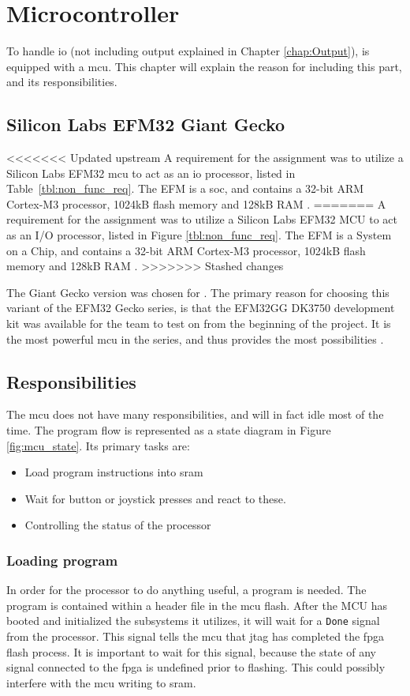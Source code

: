 \chapter{Microcontroller}
\label{ch:mcu}

To handle \gls{io} (not including output explained in Chapter \ref{chap:Output}), \vthreek is equipped with a \gls{mcu}.
This chapter will explain the reason for including this part, and its responsibilities.

\section{Silicon Labs EFM32 Giant Gecko}
<<<<<<< Updated upstream
A requirement for the assignment was to utilize a Silicon Labs EFM32 \gls{mcu} to act as an \gls{io} processor, listed in Table~\ref{tbl:non_func_req}.
The EFM is a \gls{soc}, and contains a 32-bit ARM Cortex-M3 processor, 1024kB flash memory and 128kB RAM \cite{efm32referencemanual}.
=======
A requirement for the assignment was to utilize a Silicon Labs EFM32 MCU to act as an I/O processor, listed in Figure \ref{tbl:non_func_req}.
The EFM is a System on a Chip, and contains a 32-bit ARM Cortex-M3 processor, 1024kB flash memory and 128kB RAM \cite{efm32referencemanual}.
>>>>>>> Stashed changes

The Giant Gecko version was chosen for \vthreek.
The primary reason for choosing this variant of the EFM32 Gecko series, is that the EFM32GG DK3750 development kit was available for the team to test on from the beginning of the project.
It is the most powerful \gls{mcu} in the series, and thus provides the most possibilities \cite{efm32}.

\section{Responsibilities}
The \gls{mcu} does not have many responsibilities, and will in fact idle most of the time. The program flow is represented as a state diagram in Figure \ref{fig:mcu_state}.
Its primary tasks are:
\begin{itemize}
\item Load program instructions into \gls{sram}
\item Wait for button or joystick presses and react to these.
\item Controlling the status of the processor
\end{itemize}

\subsection{Loading program}
In order for the processor to do anything useful, a program is needed.
The program is contained within a header file in the \gls{mcu} flash.
After the MCU has booted and initialized the subsystems it utilizes, it will wait for a \texttt{Done} signal from the processor.
This signal tells the \gls{mcu} that \gls{jtag} has completed the \gls{fpga} flash process.
It is important to wait for this signal, because the state of any signal connected to the \gls{fpga} is undefined prior to flashing.
This could possibly interfere with the \gls{mcu} writing to \gls{sram}.


